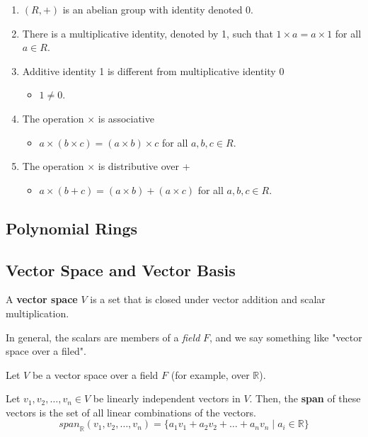\documentclass[12pt]{article}
\begin{document}
\begin{enumerate}
    \item $(R, +)$ is an abelian group with identity denoted 0.
    \item There is a multiplicative identity, denoted by 1, such that $1 \times a = a \times 1$
              for all $a \in R$.
    \item Additive identity 1 is different from multiplicative identity 0
        \begin{itemize}
            \item $1 \neq 0$.
        \end{itemize}
    \item The operation  $\times$ is associative
        \begin{itemize}
            \item $a \times (b \times c) = (a \times b) \times c$ for all $a, b, c \in R.$
        \end{itemize}
    \item The operation $\times$ is distributive over +
        \begin{itemize}
            \item $a \times (b + c) = (a \times b) + (a \times c)$ for all $a, b, c \in R.$
        \end{itemize}
\end{enumerate}

\subsection{Polynomial Rings}

\subsection{Vector Space and Vector Basis}
\noindent
A \textbf{vector space} $V$ is a set that is closed under vector addition and scalar multiplication.

\noindent
In general, the scalars are members of a \textit{field} $F$, and we say something like "vector space over a filed".

\noindent
Let $V$ be a vector space over a field $F$ (for example, over $\mathbb{R}$).


\noindent
Let $v_1, v_2, \ldots, v_n \in V$ be linearly independent vectors in $V$. Then, the \textbf{span}
of these vectors is the set of all linear combinations of the vectors.
$$
    \textit{span}_{\mathbb{R}}(v_1, v_2, \ldots, v_n) = \{a_1 v_1 + a_2 v_2 + \ldots + a_n v_n \mid a_i \in \mathbb{R}\}
$$
\end{document}
